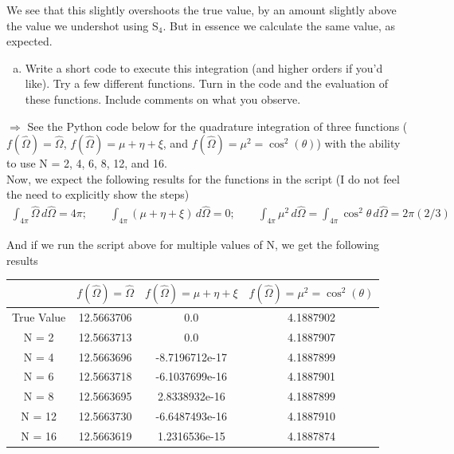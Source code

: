 \documentclass[10pt]{article}
\begin{document}
We see that this slightly overshoots the true value, by an amount slightly above the value we undershot using S$_4$. But in essence we calculate the same value, as expected.


\vspace{10pt}
\begin{enumerate}[(c)]
\item Write a short code to execute this integration (and higher orders if you'd like). Try a few different functions. Turn in the code and the evaluation of these functions. Include comments on what you observe. \\[-5pt]
\end{enumerate}

$\Rightarrow$ See the Python code below for the quadrature integration of three functions ($f(\hat{\Omega}) = \hat{\Omega}$, $f(\hat{\Omega}) = \mu + \eta + \xi$, and $f(\hat{\Omega}) = \mu^2 = \cos^2(\theta)$) with the ability to use N = 2, 4, 6, 8, 12, and 16.\\



Now, we expect the following results for the functions in the script (I do not feel the need to explicitly show the steps)
%
\begin{align*}
    \int_{4\pi} \hat{\Omega}\,d\hat{\Omega} =  4\pi ;\quad\quad
    \int_{4\pi} (\mu + \eta + \xi)\,d\hat{\Omega} = 0 ;\quad\quad
    \int_{4\pi} \mu^2\,d\hat{\Omega} = \int_{4\pi} \cos^2\theta\,d\hat{\Omega} = 2\pi(2/3)
\end{align*}

And if we run the script above for multiple values of N, we get the following results

\begin{table}[htb]
    \centering
    \begin{tabular}{|c|c|c|c|}
        \hline
        & $f(\hat{\Omega}) = \hat{\Omega}$ & $f(\hat{\Omega}) = \mu + \eta + \xi$ & $f(\hat{\Omega}) = \mu^2 = \cos^2(\theta)$ \\ \hline
        True Value & 12.5663706 & 0.0            & 4.1887902 \\\hline
        N = 2      & 12.5663713 & 0.0            & 4.1887907 \\\hline
        N = 4      & 12.5663696 & -8.7196712e-17 & 4.1887899 \\\hline
        N = 6      & 12.5663718 & -6.1037699e-16 & 4.1887901 \\\hline
        N = 8      & 12.5663695 & 2.8338932e-16  & 4.1887899 \\\hline
        N = 12     & 12.5663730 & -6.6487493e-16 & 4.1887910 \\\hline
        N = 16     & 12.5663619 & 1.2316536e-15  & 4.1887874 \\\hline
    \end{tabular}
\end{table}
\end{document}
